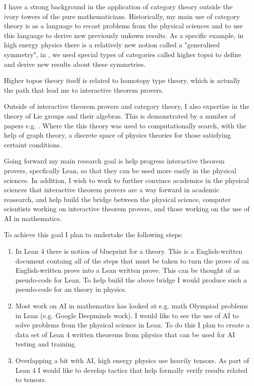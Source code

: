 \documentclass[14pt,letter]{article}
\newcounter{customtitle}
\begin{document}
 I have a strong background in the application of category theory 
outside the ivory towers of the pure mathematicians. Historically, my main use of category theory 
is as a language to recast problems from the physical sciences and to use this language 
to derive new previously unkown results. As a specific example, in high energy physics 
there is a relatively new notion called a "generalised symmetry", in  , 
we used special types of categories called higher topoi to define and derive new results 
about these symmetries. 

Higher topos theory itself is related to homotopy type theory, which is actually 
the path that lead me to interactive theorem provers. 


Outside of interactive theorem provers and category theory, 
I also expertise in the theory of Lie groups and their algebras. 
This is demonstrated by a number of papers e.g. . Where 
the this theory was used to computationally search, with the help of 
graph theory, a discrete space 
of physics theories for those satisfying certaint conditions. 




Going forward my main research goal is help progress interactive theorem provers, 
specfically Lean,
so that they can be used more easily in the physical sciences. 
In addition, I wish to work to further convince academics in the physical sciences 
that interactive theorem provers are a way forward in academic reasearch, and 
help build the bridge between the physical science, computer scientists 
working on interactive theorem provers, and those working on 
the use of AI in mathematics. 

To achieve this goal I plan to undertake the following steps:

\begin{enumerate}
\item In Lean 4 there is notion of blueprint for a theory. This is 
a English-written document containg all of the steps that must be taken
to turn the prove of an English-written prove into a Lean written prove. 
This can be thought of as pseudo-code for Lean. To help build the above 
bridge I would produce such a pseudo-code for an theory in physics.
\item Most work on AI in mathematics has looked at e.g. math Olympiad problems
in Lean (e.g. Google Deepminds work). I would like to see the use 
of AI to solve problems from the physical science in Lean. To do this 
I plan to create a data set of Lean 4 written theorems from physics 
that can be used for AI testing and training.
\item Overlapping a bit with AI, high energy physics use heavily tensors. 
As part of Lean 4 I would like to develop tactics that help formally verify 
results related to tensors.
\end{enumerate}
\end{document}
